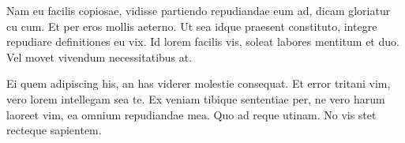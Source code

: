 Nam eu facilis copiosae, vidisse partiendo repudiandae eum ad, dicam gloriatur cu cum. Et per eros mollis aeterno. Ut sea idque praesent constituto, integre repudiare definitiones eu vix. Id lorem facilis vis, soleat labores mentitum et duo. Vel movet vivendum necessitatibus at.

Ei quem adipiscing his, an has viderer molestie consequat. Et error tritani vim, vero lorem intellegam sea te. Ex veniam tibique sententiae per, ne vero harum laoreet vim, ea omnium repudiandae mea. Quo ad reque utinam. No vis stet recteque sapientem.

